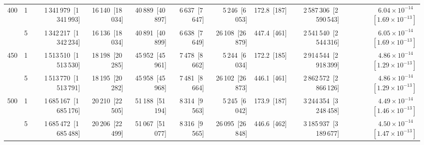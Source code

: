 \begin{tabular}{llrrrrrrrr}
\cline{1-10}
\multirow[t]{2}{*}{400} & 1 & 1\,341\,979~{\footnotesize[1\,341\,993]} & 16\,140~{\footnotesize[18\,034]} & 40\,889~{\footnotesize[40\,897]} & 6\,637~{\footnotesize[7\,647]} & 5\,246~{\footnotesize[6\,053]} & 172.8~{\footnotesize[187]} & 2\,587\,306~{\footnotesize[2\,590\,543]} & $6.04\!\times\!10^{-14}$~{\footnotesize $[1.69\!\times\!10^{-13}]$} \\
 & 5 & 1\,342\,217~{\footnotesize[1\,342\,234]} & 16\,136~{\footnotesize[18\,034]} & 40\,891~{\footnotesize[40\,899]} & 6\,638~{\footnotesize[7\,649]} & 26\,108~{\footnotesize[26\,879]} & 447.4~{\footnotesize[461]} & 2\,541\,540~{\footnotesize[2\,544\,316]} & $6.05\!\times\!10^{-14}$~{\footnotesize $[1.69\!\times\!10^{-13}]$} \\
\cline{1-10}
\multirow[t]{2}{*}{450} & 1 & 1\,513\,510~{\footnotesize[1\,513\,530]} & 18\,198~{\footnotesize[20\,285]} & 45\,952~{\footnotesize[45\,961]} & 7\,478~{\footnotesize[8\,662]} & 5\,244~{\footnotesize[6\,034]} & 172.2~{\footnotesize[185]} & 2\,914\,544~{\footnotesize[2\,918\,399]} & $4.86\!\times\!10^{-14}$~{\footnotesize $[1.29\!\times\!10^{-13}]$} \\
 & 5 & 1\,513\,770~{\footnotesize[1\,513\,791]} & 18\,195~{\footnotesize[20\,282]} & 45\,958~{\footnotesize[45\,968]} & 7\,481~{\footnotesize[8\,664]} & 26\,102~{\footnotesize[26\,873]} & 446.1~{\footnotesize[461]} & 2\,862\,572~{\footnotesize[2\,866\,126]} & $4.86\!\times\!10^{-14}$~{\footnotesize $[1.29\!\times\!10^{-13}]$} \\
\cline{1-10}
\multirow[t]{2}{*}{500} & 1 & 1\,685\,167~{\footnotesize[1\,685\,176]} & 20\,210~{\footnotesize[22\,505]} & 51\,188~{\footnotesize[51\,194]} & 8\,314~{\footnotesize[9\,563]} & 5\,245~{\footnotesize[6\,042]} & 173.9~{\footnotesize[187]} & 3\,244\,354~{\footnotesize[3\,248\,458]} & $4.49\!\times\!10^{-14}$~{\footnotesize $[1.46\!\times\!10^{-13}]$} \\
 & 5 & 1\,685\,472~{\footnotesize[1\,685\,488]} & 20\,206~{\footnotesize[22\,499]} & 51\,067~{\footnotesize[51\,077]} & 8\,316~{\footnotesize[9\,565]} & 26\,095~{\footnotesize[26\,848]} & 446.6~{\footnotesize[462]} & 3\,185\,937~{\footnotesize[3\,189\,677]} & $4.50\!\times\!10^{-14}$~{\footnotesize $[1.47\!\times\!10^{-13}]$} \\
\cline{1-10}
\bottomrule
\end{tabular}
